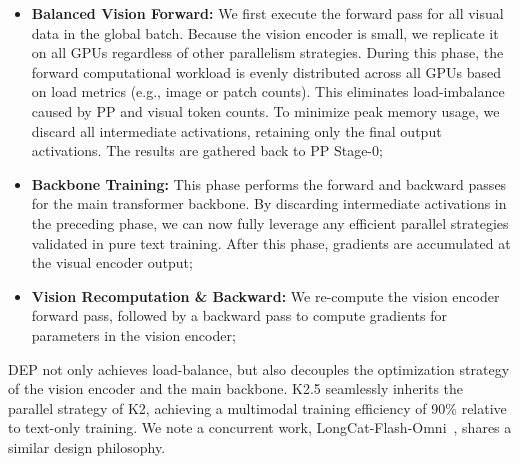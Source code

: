 \begin{itemize}
\item \textbf{Balanced Vision Forward:} We first execute the forward pass for all visual data in the global batch. Because the vision encoder is small, we replicate it on all GPUs regardless of other parallelism strategies. During this phase, the forward computational workload is evenly distributed across all GPUs based on load metrics (e.g., image or patch counts). This eliminates load-imbalance caused by PP and visual token counts. To minimize peak memory usage, we discard all intermediate activations, retaining only the final output activations. The results are gathered back to PP Stage-0;

\item \textbf{Backbone Training:} This phase performs the forward and backward passes for the main transformer backbone. By discarding intermediate activations in the preceding phase, we can now fully leverage any efficient parallel strategies validated in pure text training. After this phase, gradients are accumulated at the visual encoder output;
\item \textbf{Vision Recomputation \& Backward:} We re-compute the vision encoder forward pass, followed by a backward pass to compute gradients for parameters in the vision encoder;
\end{itemize}

DEP not only achieves load-balance, but also decouples the optimization strategy of the vision encoder and the main backbone. K2.5 seamlessly inherits the parallel strategy of K2, achieving a multimodal training efficiency of 90\% relative to text-only training. We note a concurrent work, LongCat-Flash-Omni~\citep{team2025longcat}, shares a similar design philosophy.



